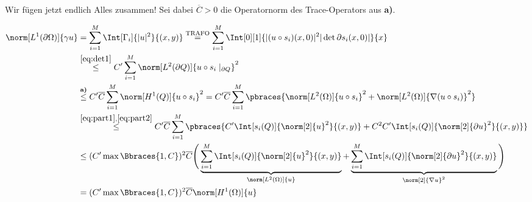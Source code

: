 \begin{solution}
\begin{enumerate}[label = \textbf{\alph*)}]
\begin{enumerate}[label = \arabic*.]
\begin{enumerate}[label = \arabic*.]
    \end{enumerate}

    Wir fügen jetzt endlich Alles zusammen!
    Sei dabei $\overline{C} > 0$ die Operatornorm des Trace-Operators aus \textbf{a)}.

    \begin{align*}
      \norm[L^1(\partial \Omega)]{\gamma u}
      & =
      \sum_{i=1}^M
      \Int[\Gamma_i]{|u|^2}{(x, y)}
      \stackrel
      {
        \text{TRAFO}
      }{=}
      \sum_{i=1}^M
      \Int[0][1]{|(u \circ s_i)(x, 0)|^2 |\det \partial s_i(x, 0)|}{x} \\
      & \stackrel{\eqref{eq:det1}}{\leq}
      C^\prime
      \sum_{i=1}^M
      \norm[L^2(\partial Q)]{u \circ s_i \mid_{\partial Q}}^2 \\
      & \stackrel
      {
        \textbf{a)}
      }{\leq}
      C^\prime
      \overline{C}
      \sum_{i=1}^M
      \norm[H^1(Q)]{u \circ s_i}^2
      =
      C^\prime
      \overline{C}
      \sum_{i=1}^M
      \pbraces
      {
        \norm[L^2(\Omega)]{u \circ s_i}^2
        +
        \norm[L^2(\Omega)]{\nabla (u \circ s_i)}^2
      } \\
      & \stackrel
      {
        \eqref{eq:part1},
        \eqref{eq:part2}
      }{\leq}
      C^\prime
      \overline{C}
      \sum_{i=1}^M
      \pbraces
      {
        C^\prime
        \Int[s_i(Q)]{\norm[2]{u}^2}{(x, y)}
        +
        C^2 C^\prime
        \Int[s_i(Q)]{\norm[2]{\partial u}^2}{(x, y)}
      } \\
      & \leq
      (
        C^\prime
        \max \Bbraces{1, C}
      )^2
      \overline{C}
      \Bigg (
        \underbrace
        {
          \sum_{i=1}^M
          \Int[s_i(Q)]{\norm[2]{u}^2}{(x, y)}
        }_{
          \norm[L^2(\Omega)]{u}
        }
        +
        \underbrace
        {
          \sum_{i=1}^M
          \Int[s_i(Q)]{\norm[2]{\partial u}^2}{(x, y)}
        }_{
          \norm[2]{\nabla u}^2
        }
      \Bigg ) \\
      & =
      (
        C^\prime
        \max \Bbraces{1, C}
      )^2
      \overline{C}
      \norm[H^1(\Omega)]{u}
    \end{align*}

  \end{enumerate}

  \end{enumerate}

\end{solution}

